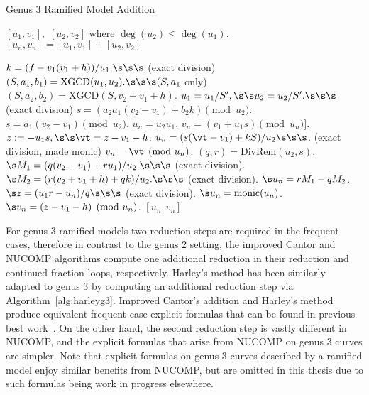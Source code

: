 \begin{algorithm}[htbp]
    \caption{Genus 3 Ramified Model Addition}
    \label{alg:g3nucomp}
    \begin{algorithmic}[1]
    \Require $[u_1,v_1],$ $[u_2,v_2]$ where $\deg(u_2) \leq \deg(u_1)$.
    \Ensure $[u_n,v_n] = [u_1,v_1] + [u_2,v_2]$

    \State $k = (f - v_1(v_1 + h))/u_1. \s\s\s$ (exact division)
    \State $(S,a_1,b_1) = \mathrm{XGCD}(u_1,u_2). \s\s\s  (S, a_1$ only)
        \State $(S,a_2,b_2) = \mathrm{XGCD}(S,v_2 + v_1 + h)$.
            \State $u_1 = u_1/S', \s\s u_2 = u_2/S'. \s\s\s$ (exact division)
        \EndIf
        \State $s = (a_2a_1(v_2 - v_1) + b_2k) \pmod{u_2}$.
    \Else
        \State $s = a_1(v_2 - v_1) \pmod{u_2}$.
    \EndIf
        \State $u_n = u_2u_1$.
        \State $v_n = (v_1 + u_1s) \pmod{u_n}]$.
        \State $z := -u_1s, \s\s \vt = z - v_1 - h$.
        \State $u_n = (s(\vt - v_1) + kS)/u_2 \s\s\s$. (exact division, made monic)
        \State $v_n = \vt \pmod{u_n}$.
    \Else\hspace{2pt} 
        \State $(q,r) = \mathrm{DivRem}(u_2,s)$.
        \State $\s M_1 = (q(v_2 - v_1) + ru_1)/u_2. \s\s\s$ (exact division).
        \State $\s M_2 = (r(v_2 + v_1 + h) + qk)/u_2. \s\s\s$ (exact division).
        \State $\s u_n = rM_1 - qM_2$.
        \State $\s z = (u_1r - u_n)/q \s\s\s$ (exact division).
        \State $\s u_n = \mathrm{monic}(u_n)$.
        \State $\s v_n = (z - v_1 - h) \pmod{u_n}$.
    \EndIf
    \State \Return $[u_n,v_n]$
    \end{algorithmic}
    \end{algorithm}

For genus 3 ramified models two reduction steps are required in the frequent
cases, therefore in contrast to the genus 2 setting, the improved Cantor and
NUCOMP algorithms compute one additional reduction in their reduction and
continued fraction loops, respectively. Harley's method has been similarly
adapted to genus 3 by computing an additional reduction step via
Algorithm~\ref{alg:harleyg3}. Improved Cantor's addition and Harley's method
produce equivalent frequent-case explicit formulas that can be found in previous
best work~\cite{fan_g3_2006}. On the other hand, the second reduction step is
vastly different in NUCOMP, and the explicit formulas that arise from NUCOMP
on genus 3 curves are simpler. Note that explicit formulas on genus 3 curves
described by a ramified model enjoy similar benefits from NUCOMP, but are
omitted in this thesis due to such formulas being work in progress elsewhere.

